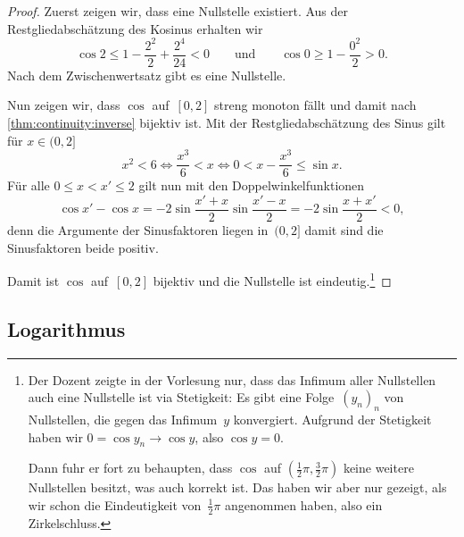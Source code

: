 \documentclass[a4paper]{article}
\begin{document}
\begin{proof}
    Zuerst zeigen wir, dass eine Nullstelle existiert. Aus der Restgliedabschätzung des Kosinus erhalten wir
    \begin{equation*}
        \cos2 \leq 1-\frac{2^2}{2}+\frac{2^4}{24} < 0 \qquad\text{und}\qquad \cos0 \geq 1-\frac{0^2}{2} > 0.
    \end{equation*}
    Nach dem Zwischenwertsatz gibt es eine Nullstelle.

    Nun zeigen wir, dass $\cos$ auf~$[0, 2]$ streng monoton fällt und damit nach \cref{thm:continuity:inverse} bijektiv ist. Mit der Restgliedabschätzung des Sinus gilt für $x \in (0, 2]$
    \begin{equation*}
        x^2 < 6 \iff \frac{x^3}{6} < x \iff 0 < x - \frac{x^3}{6} \leq \sin x.
    \end{equation*}
    Für alle $0 \leq x < x' \leq 2$ gilt nun mit den Doppelwinkelfunktionen
    \begin{equation*}
        \cos x' - \cos x = -2 \sin\frac{x'+x}{2} \sin\frac{x'-x}{2} = -2 \sin\frac{x+x'}{2} < 0,
    \end{equation*}
    denn die Argumente der Sinusfaktoren liegen in~$(0, 2]$ damit sind die Sinusfaktoren beide positiv.

    Damit ist $\cos$ auf~$[0, 2]$ bijektiv und die Nullstelle ist eindeutig.\footnote{Der Dozent zeigte in der Vorlesung nur, dass das Infimum aller Nullstellen auch eine Nullstelle ist via Stetigkeit: Es gibt eine Folge~$(y_n)_n$ von Nullstellen, die gegen das Infimum~$y$ konvergiert. Aufgrund der Stetigkeit haben wir $0 = \cos y_n \to \cos y$, also $\cos y = 0$.

        Dann fuhr er fort zu behaupten, dass $\cos$ auf $(\frac{1}{2}\pi, \frac{3}{2}\pi)$ keine weitere Nullstellen besitzt, was auch korrekt ist. Das haben wir aber nur gezeigt, als wir schon die Eindeutigkeit von~$\frac{1}{2}\pi$ angenommen haben, also ein Zirkelschluss.}
\end{proof}

\subsection{Logarithmus}
\end{document}
